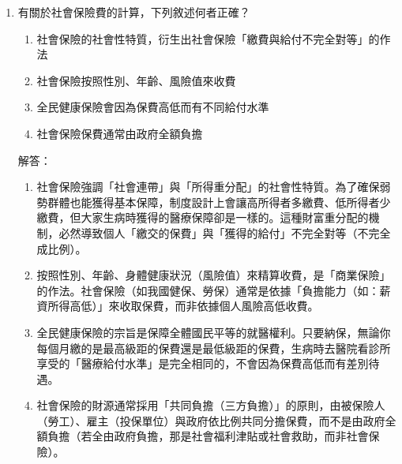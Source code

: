 \documentclass[12pt, a4paper]{article}
\begin{document}
\begin{enumerate}
    \item 有關於社會保險費的計算，下列敘述何者正確？
    \begin{enumerate}[label=\Alph*.]
        \item 社會保險的社會性特質，衍生出社會保險「繳費與給付不完全對等」的作法
        \item 社會保險按照性別、年齡、風險值來收費
        \item 全民健康保險會因為保費高低而有不同給付水準
        \item 社會保險保費通常由政府全額負擔
    \end{enumerate}
    解答：
    \begin{enumerate}[label=\Alph*.]
        \item 社會保險強調「社會連帶」與「所得重分配」的社會性特質。為了確保弱勢群體也能獲得基本保障，制度設計上會讓高所得者多繳費、低所得者少繳費，但大家生病時獲得的醫療保障卻是一樣的。這種財富重分配的機制，必然導致個人「繳交的保費」與「獲得的給付」不完全對等（不完全成比例）。
        \item 按照性別、年齡、身體健康狀況（風險值）來精算收費，是「商業保險」的作法。社會保險（如我國健保、勞保）通常是依據「負擔能力（如：薪資所得高低）」來收取保費，而非依據個人風險高低收費。
        \item 全民健康保險的宗旨是保障全體國民平等的就醫權利。只要納保，無論你每個月繳的是最高級距的保費還是最低級距的保費，生病時去醫院看診所享受的「醫療給付水準」是完全相同的，不會因為保費高低而有差別待遇。
        \item 社會保險的財源通常採用「共同負擔（三方負擔）」的原則，由被保險人（勞工）、雇主（投保單位）與政府依比例共同分擔保費，而不是由政府全額負擔（若全由政府負擔，那是社會福利津貼或社會救助，而非社會保險）。
    \end{enumerate}


\end{enumerate}
\end{document}
